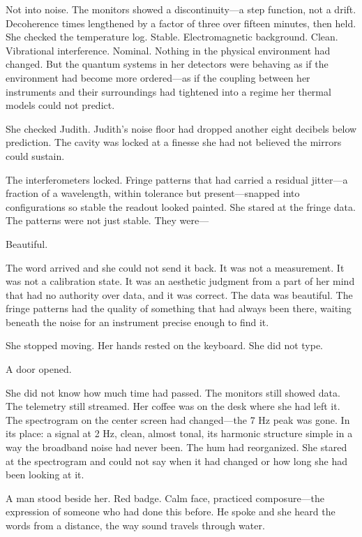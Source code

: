 Not into noise. The monitors showed a discontinuity---a step function, not a drift. Decoherence times lengthened by a factor of three over fifteen minutes, then held. She checked the temperature log. Stable. Electromagnetic background. Clean. Vibrational interference. Nominal. Nothing in the physical environment had changed. But the quantum systems in her detectors were behaving as if the environment had become more ordered---as if the coupling between her instruments and their surroundings had tightened into a regime her thermal models could not predict.

She checked Judith. Judith's noise floor had dropped another eight decibels below prediction. The cavity was locked at a finesse she had not believed the mirrors could sustain.

The interferometers locked. Fringe patterns that had carried a residual jitter---a fraction of a wavelength, within tolerance but present---snapped into configurations so stable the readout looked painted. She stared at the fringe data. The patterns were not just stable. They were---

Beautiful.

The word arrived and she could not send it back. It was not a measurement. It was not a calibration state. It was an aesthetic judgment from a part of her mind that had no authority over data, and it was correct. The data was beautiful. The fringe patterns had the quality of something that had always been there, waiting beneath the noise for an instrument precise enough to find it.

She stopped moving. Her hands rested on the keyboard. She did not type.

\scenebreak

A door opened.

She did not know how much time had passed. The monitors still showed data. The telemetry still streamed. Her coffee was on the desk where she had left it. The spectrogram on the center screen had changed---the 7 Hz peak was gone. In its place: a signal at 2 Hz, clean, almost tonal, its harmonic structure simple in a way the broadband noise had never been. The hum had reorganized. She stared at the spectrogram and could not say when it had changed or how long she had been looking at it.

A man stood beside her. Red badge. Calm face, practiced composure---the expression of someone who had done this before. He spoke and she heard the words from a distance, the way sound travels through water.

